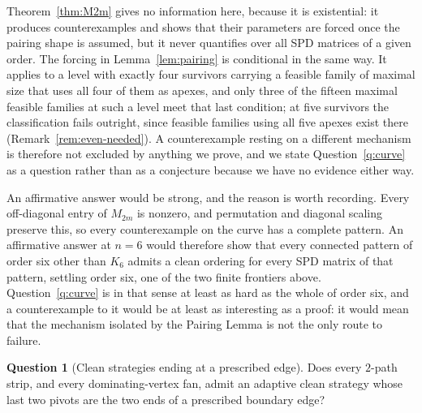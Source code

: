 \documentclass[11pt]{article}
\theoremstyle{plain}
\theoremstyle{definition}
\newtheorem{question}[theorem]{Question}
\theoremstyle{remark}
\begin{document}
\begin{humanblock}
Theorem~\ref{thm:M2m} gives no information here, because it is existential: it produces
counterexamples and shows that their parameters are forced once the pairing shape is assumed, but it
never quantifies over all SPD matrices of a given order. The forcing in Lemma~\ref{lem:pairing} is
conditional in the same way. It applies to a level with exactly four survivors carrying a feasible
family of maximal size that uses all four of them as apexes, and only three of the fifteen maximal
feasible families at such a level meet that last condition; at five survivors the classification fails
outright, since feasible families using all five apexes exist there
(Remark~\ref{rem:even-needed}). A counterexample resting on a different mechanism is therefore not
excluded by anything we prove, and we state Question~\ref{q:curve} as a question rather than as a
conjecture because we have no evidence either way.

An affirmative answer would be strong, and the reason is worth recording. Every off-diagonal entry of
$M_{2m}$ is nonzero, and permutation and diagonal scaling preserve this, so every counterexample on the
curve has a complete pattern. An affirmative answer at $n=6$ would therefore show that every connected
pattern of order six other than $K_6$ admits a clean ordering for every SPD matrix of that pattern,
settling order six, one of the two finite frontiers above. Question~\ref{q:curve} is in that sense at
least as hard as the whole of order six, and a counterexample to it would be at least as interesting as a proof: it would mean
that the mechanism isolated by the Pairing Lemma is not the only route to failure.

\begin{question}[Clean strategies ending at a prescribed edge]\label{q:cliquesum}
Does every $2$-path strip, and every dominating-vertex fan, admit an adaptive clean strategy whose
last two pivots are the two ends of a prescribed boundary edge?
\end{question}


\end{humanblock}
\end{document}
